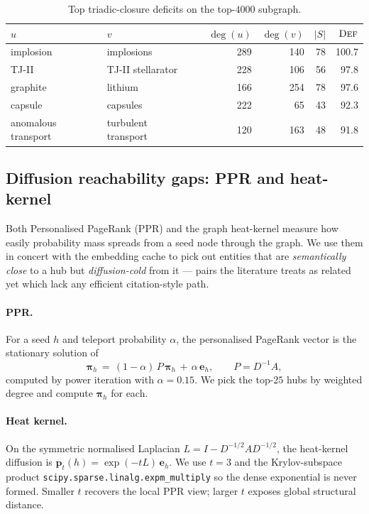 \documentclass[11pt,a4paper]{article}
\newcommand{\code}[1]{\texttt{\small #1}}
\begin{document}
\begin{table}[t]
\centering
\caption{Top triadic-closure deficits on the top-$4000$ subgraph.}
\label{tab:triadic}
\small
\begin{tabular}{lllrrrr}
\toprule
$u$ & $v$ & & $\deg(u)$ & $\deg(v)$ & $|S|$ & $\textsc{Def}$ \\
\midrule
implosion & implosions & & 289 & 140 & 78 & 100.7 \\
TJ-II & TJ-II stellarator & & 228 & 106 & 56 & 97.8 \\
graphite & lithium & & 166 & 254 & 78 & 97.6 \\
capsule & capsules & & 222 & 65 & 43 & 92.3 \\
anomalous transport & turbulent transport & & 120 & 163 & 48 & 91.8 \\
\bottomrule
\end{tabular}
\end{table}

\subsection{Diffusion reachability gaps: PPR and heat-kernel}
\label{sec:diff}
Both Personalised PageRank (PPR) and the graph heat-kernel measure how easily probability mass spreads from a seed node through the graph. We use them in concert with the embedding cache to pick out entities that are \emph{semantically close} to a hub but \emph{diffusion-cold} from it --- pairs the literature treats as related yet which lack any efficient citation-style path.

\paragraph{PPR.}
For a seed $h$ and teleport probability $\alpha$, the personalised PageRank vector is the stationary solution of
\begin{equation}
\boldsymbol{\pi}_h \,=\, (1-\alpha)\,P\,\boldsymbol{\pi}_h \,+\, \alpha\,\mathbf{e}_h, \qquad P=D^{-1}A,
\end{equation}
computed by power iteration with $\alpha=0.15$. We pick the top-$25$ hubs by weighted degree and compute $\boldsymbol{\pi}_h$ for each.

\paragraph{Heat kernel.}
On the symmetric normalised Laplacian $L=I-D^{-1/2}AD^{-1/2}$, the heat-kernel diffusion is $\mathbf{p}_t(h) = \exp(-tL)\,\mathbf{e}_h$. We use $t=3$ and the Krylov-subspace product \code{scipy.sparse.linalg.expm\_multiply} so the dense exponential is never formed. Smaller $t$ recovers the local PPR view; larger $t$ exposes global structural distance.
\end{document}
